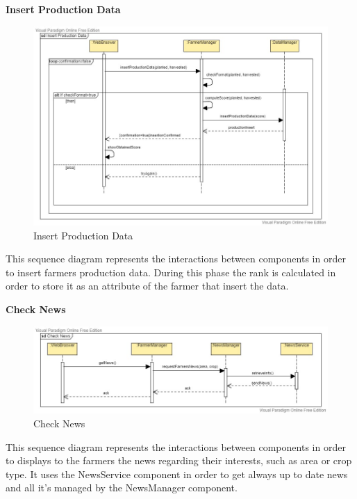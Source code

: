 \documentclass[table, 12pt]{article}
\begin{document}
\newpage
\textbf{Insert Production Data}
\begin{center}
    \begin{figure}[H]
        \includegraphics[scale=0.6, center]{assets/SequenceDiagram/InsertProduction.jpg}
        \caption{Insert Production Data}
        \label{fig: production}
    \end{figure}
\end{center}
This sequence diagram represents the interactions between components in order to insert farmers production data.
During this phase the rank is calculated in order to store it as an attribute of the farmer that insert the data.

\newpage
\textbf{Check News}
\begin{center}
    \begin{figure}[H]
        \includegraphics[scale=0.6, center]{assets/SequenceDiagram/CheckNews.jpg}
        \caption{Check News}
        \label{fig: news}
    \end{figure}
\end{center}
This sequence diagram represents the interactions between components in order to displays to the farmers the news regarding their interests, such as area or crop type.
It uses the NewsService component in order to get always up to date news and all it's managed by the NewsManager component.
\end{document}
